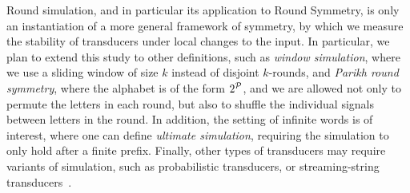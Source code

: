 Round simulation, and in particular its application to Round Symmetry, is only an instantiation of a more general framework of symmetry, by which we measure the stability of transducers under local changes to the input. In particular, we plan to extend this study to other definitions, such as \emph{window simulation}, where we use a sliding window of size $k$ instead of disjoint $k$-rounds, and \emph{Parikh round symmetry}, where the alphabet is of the form $2^{\mathcal{P}}$, and we are allowed not only to permute the letters in each round, but also to shuffle the individual signals between letters in the round. 
In addition, the setting of infinite words is of interest, where one can define \emph{ultimate simulation}, requiring the simulation to only hold after a finite prefix. 
Finally, other types of transducers may require variants of simulation, such as probabilistic transducers, or streaming-string transducers~\cite{Alur2010}.
